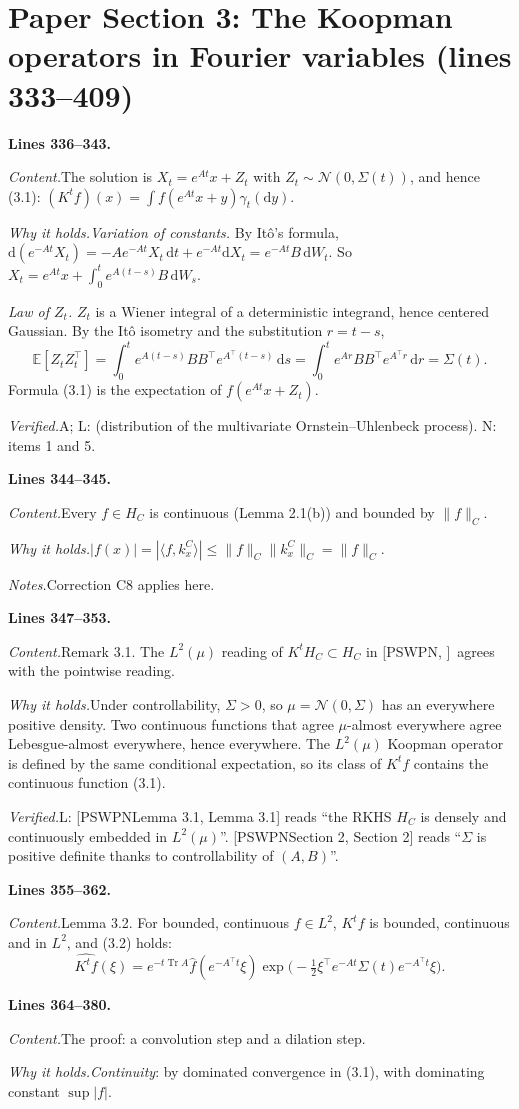 \documentclass[11pt]{amsart}
\newcommand{\Tr}{\operatorname{Tr}}
\newcommand{\dd}{\,\mathrm{d}}
\newcommand{\ip}[2]{\langle #1,#2\rangle}
\newcommand{\hatf}[1]{\widehat{#1}}
\newcommand{\tp}{\top}
\newcommand{\src}[1]{\par\bigskip\noindent\textbf{Lines #1.}\enspace}
\newcommand{\content}{\par\smallskip\noindent\textit{Content.}\enspace}
\newcommand{\why}{\par\smallskip\noindent\textit{Why it holds.}\enspace}
\newcommand{\verified}{\par\smallskip\noindent\textit{Verified.}\enspace}
\newcommand{\notes}{\par\smallskip\noindent\textit{Notes.}\enspace}
\newcommand{\tA}{\textsf{A}}
\newcommand{\tN}{\textsf{N}}
\newcommand{\tL}{\textsf{L}}
\newcommand{\PS}[1][]{[PSWPN\ifx\relax#1\relax\else, #1\fi]}
\begin{document}
\section{Paper Section 3: The Koopman operators in Fourier variables (lines 333--409)}\label{sec:koop}

\src{336--343}
\content The solution is $X_t=e^{At}x+Z_t$ with $Z_t\sim\mathcal N(0,\Sigma(t))$, and hence (3.1):
$(K^tf)(x)=\int f(e^{At}x+y)\gamma_t(\mathrm dy)$.
\why \emph{Variation of constants.} By It\^o's formula, $\mathrm d(e^{-At}X_t)=-Ae^{-At}X_t\dd t+e^{-At}\mathrm
dX_t=e^{-At}B\dd W_t$. So $X_t=e^{At}x+\int_0^te^{A(t-s)}B\dd W_s$.

\emph{Law of $Z_t$.} $Z_t$ is a Wiener integral of a deterministic integrand, hence centered Gaussian. By the It\^o
isometry and the substitution $r=t-s$,
\[
\mathbb E[Z_tZ_t^\tp]=\int_0^te^{A(t-s)}BB^\tp e^{A^\tp(t-s)}\dd s=\int_0^te^{Ar}BB^\tp e^{A^\tp r}\dd r=\Sigma(t).
\]
Formula (3.1) is the expectation of $f(e^{At}x+Z_t)$.
\verified \tA; \tL: \cite{Vatiwutipong} (distribution of the multivariate Ornstein--Uhlenbeck process). \tN: items 1
and 5.

\src{344--345}
\content Every $f\in H_C$ is continuous (Lemma 2.1(b)) and bounded by $\|f\|_C$.
\why $|f(x)|=|\ip f{k^C_x}|\le\|f\|_C\|k^C_x\|_C=\|f\|_C$.
\notes Correction C8 applies here.

\src{347--353}
\content Remark 3.1. The $L^2(\mu)$ reading of $K^tH_C\subset H_C$ in \PS\ agrees with the pointwise reading.
\why Under controllability, $\Sigma>0$, so $\mu=\mathcal N(0,\Sigma)$ has an everywhere positive density. Two
continuous functions that agree $\mu$-almost everywhere agree Lebesgue-almost everywhere, hence everywhere. The
$L^2(\mu)$ Koopman operator is defined by the same conditional expectation, so its class of $K^tf$ contains the
continuous function (3.1).
\verified \tL: \PS[Lemma 3.1] reads ``the RKHS $H_C$ is densely and continuously embedded in $L^2(\mu)$''. \PS[Section
2] reads ``$\Sigma$ is positive definite thanks to controllability of $(A,B)$''.

\src{355--362}
\content Lemma 3.2. For bounded, continuous $f\in L^2$, $K^tf$ is bounded, continuous and in $L^2$, and (3.2) holds:
\[
\hatf{K^tf}(\xi)=e^{-t\Tr A}\hatf f(e^{-A^\tp t}\xi)\exp\bigl(-\tfrac12\xi^\tp e^{-At}\Sigma(t)e^{-A^\tp t}\xi\bigr).
\]

\src{364--380}
\content The proof: a convolution step and a dilation step.
\why \emph{Continuity}: by dominated convergence in (3.1), with dominating constant $\sup|f|$.
\end{document}
